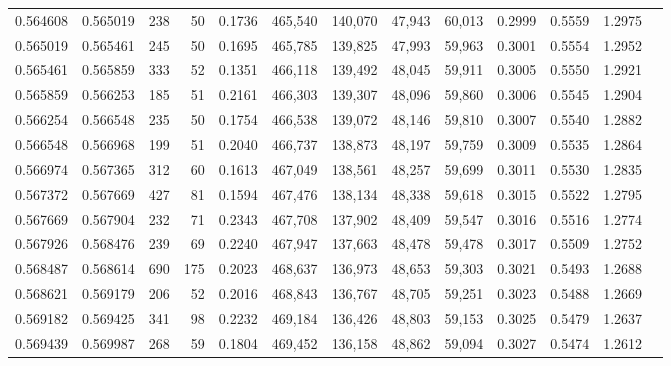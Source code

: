\begin{tabular}{rrrrrrrrrrrrr}
0.564608 & 0.565019 &   238 &  50 &                                     0.1736 & 465,540 & 140,070 &  47,943 &  60,013 & 0.2999 & 0.5559 & 1.2975 \\
0.565019 & 0.565461 &   245 &  50 &                                     0.1695 & 465,785 & 139,825 &  47,993 &  59,963 & 0.3001 & 0.5554 & 1.2952 \\
0.565461 & 0.565859 &   333 &  52 &                                     0.1351 & 466,118 & 139,492 &  48,045 &  59,911 & 0.3005 & 0.5550 & 1.2921 \\
0.565859 & 0.566253 &   185 &  51 &                                     0.2161 & 466,303 & 139,307 &  48,096 &  59,860 & 0.3006 & 0.5545 & 1.2904 \\
0.566254 & 0.566548 &   235 &  50 &                                     0.1754 & 466,538 & 139,072 &  48,146 &  59,810 & 0.3007 & 0.5540 & 1.2882 \\
0.566548 & 0.566968 &   199 &  51 &                                     0.2040 & 466,737 & 138,873 &  48,197 &  59,759 & 0.3009 & 0.5535 & 1.2864 \\
0.566974 & 0.567365 &   312 &  60 &                                     0.1613 & 467,049 & 138,561 &  48,257 &  59,699 & 0.3011 & 0.5530 & 1.2835 \\
0.567372 & 0.567669 &   427 &  81 &                                     0.1594 & 467,476 & 138,134 &  48,338 &  59,618 & 0.3015 & 0.5522 & 1.2795 \\
0.567669 & 0.567904 &   232 &  71 &                                     0.2343 & 467,708 & 137,902 &  48,409 &  59,547 & 0.3016 & 0.5516 & 1.2774 \\
0.567926 & 0.568476 &   239 &  69 &                                     0.2240 & 467,947 & 137,663 &  48,478 &  59,478 & 0.3017 & 0.5509 & 1.2752 \\
0.568487 & 0.568614 &   690 & 175 &                                     0.2023 & 468,637 & 136,973 &  48,653 &  59,303 & 0.3021 & 0.5493 & 1.2688 \\
0.568621 & 0.569179 &   206 &  52 &                                     0.2016 & 468,843 & 136,767 &  48,705 &  59,251 & 0.3023 & 0.5488 & 1.2669 \\
0.569182 & 0.569425 &   341 &  98 &                                     0.2232 & 469,184 & 136,426 &  48,803 &  59,153 & 0.3025 & 0.5479 & 1.2637 \\
0.569439 & 0.569987 &   268 &  59 &                                     0.1804 & 469,452 & 136,158 &  48,862 &  59,094 & 0.3027 & 0.5474 & 1.2612 \\

\end{tabular}
